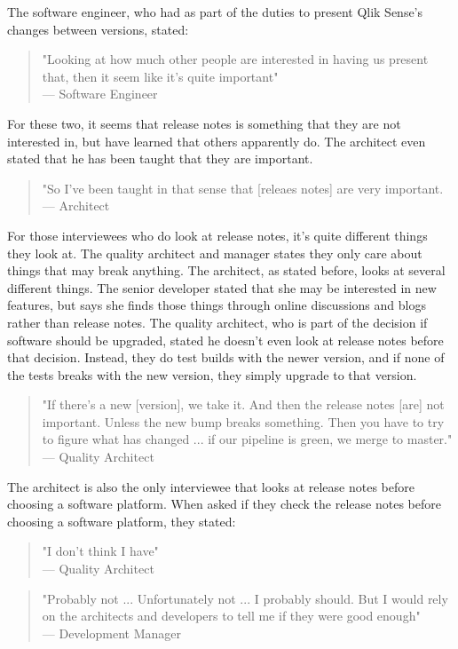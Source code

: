 \documentclass{cslthse-msc}
\begin{document}
    The software engineer, who had as part of the duties to present Qlik Sense's changes between versions, stated:
    \begin{quote}
        "Looking at how much other people are interested in having us present that, then it seem like it's quite important" \\
        --- Software Engineer
    \end{quote}
    For these two, it seems that release notes is something that they are not interested in, but have learned that others apparently do. The architect even stated that he has been taught that they are important.
    \begin{quote}
        "So I've been taught in that sense that [releaes notes] are very important. \\
        --- Architect
    \end{quote}
    For those interviewees who do look at release notes, it's quite different things they look at. The quality architect and manager states they only care about things that may break anything. The architect, as stated before, looks at several different things. The senior developer stated that she may be interested in new features, but says she finds those things through online discussions and blogs rather than release notes. The quality architect, who is part of the decision if software should be upgraded, stated he doesn't even look at release notes before that decision. Instead, they do test builds with the newer version, and if none of the tests breaks with the new version, they simply upgrade to that version.
    \begin{quote}
        "If there's a new [version], we take it. And then the release notes [are] not important. Unless the new bump breaks something. Then you have  to try to figure what has changed ... if our pipeline is green, we merge to master."\\
        --- Quality Architect
    \end{quote}
    The architect is also the only interviewee that looks at release notes before choosing a software platform.  When asked if they check the release notes before choosing a software platform, they stated:
    \begin{quote}
        "I don't think I have"\\
        --- Quality Architect
    \end{quote}
    \begin{quote}
        "Probably not ... Unfortunately not ... I probably should. But I would rely on the architects and developers to tell me if they were good enough" \\
        --- Development Manager
    \end{quote}
\end{document}
